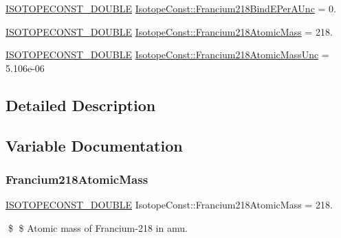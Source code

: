 \begin{DoxyCompactItemize}
\mbox{\hyperlink{group___isotope_const-_macros_ga8f45a7272ce02c0b4c65c44636ed719a}{I\+S\+O\+T\+O\+P\+E\+C\+O\+N\+S\+T\+\_\+\+D\+O\+U\+B\+LE}} \mbox{\hyperlink{group___isotope_const-_francium-_fr218_gac038268b308f19a73abe33be8b0b8855}{Isotope\+Const\+::\+Francium218\+Bind\+E\+Per\+A\+Unc}} = 0.
\item 
\mbox{\hyperlink{group___isotope_const-_macros_ga8f45a7272ce02c0b4c65c44636ed719a}{I\+S\+O\+T\+O\+P\+E\+C\+O\+N\+S\+T\+\_\+\+D\+O\+U\+B\+LE}} \mbox{\hyperlink{group___isotope_const-_francium-_fr218_gaa3a940244d2753f71f5c9dd79929ea29}{Isotope\+Const\+::\+Francium218\+Atomic\+Mass}} = 218.
\item 
\mbox{\hyperlink{group___isotope_const-_macros_ga8f45a7272ce02c0b4c65c44636ed719a}{I\+S\+O\+T\+O\+P\+E\+C\+O\+N\+S\+T\+\_\+\+D\+O\+U\+B\+LE}} \mbox{\hyperlink{group___isotope_const-_francium-_fr218_gab4d9392b34b3b4a7753deda54f57f8a6}{Isotope\+Const\+::\+Francium218\+Atomic\+Mass\+Unc}} = 5.\+106e-\/06
\end{DoxyCompactItemize}


\subsection{Detailed Description}


\subsection{Variable Documentation}
\mbox{\label{group___isotope_const-_francium-_fr218_gaa3a940244d2753f71f5c9dd79929ea29}} 
\subsubsection{\texorpdfstring{Francium218\+Atomic\+Mass}{Francium218AtomicMass}}
{\footnotesize\ttfamily \mbox{\hyperlink{group___isotope_const-_macros_ga8f45a7272ce02c0b4c65c44636ed719a}{I\+S\+O\+T\+O\+P\+E\+C\+O\+N\+S\+T\+\_\+\+D\+O\+U\+B\+LE}} Isotope\+Const\+::\+Francium218\+Atomic\+Mass = 218.}

\$ \$ Atomic mass of Francium-\/218 in amu. \mbox{\label{group___isotope_const-_francium-_fr218_gab4d9392b34b3b4a7753deda54f57f8a6}} 
